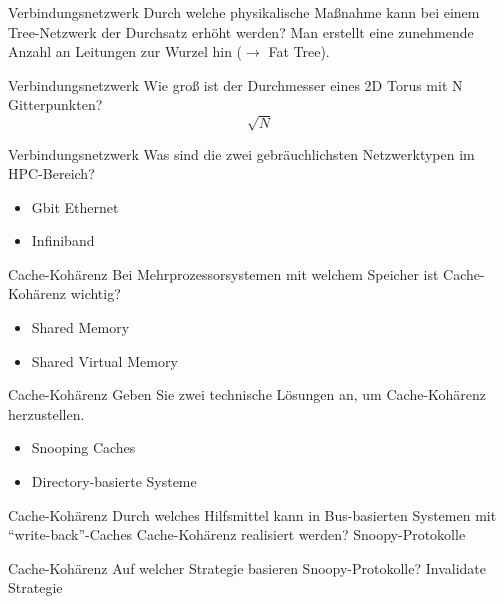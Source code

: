 \begin{aufgabe}{Verbindungsnetzwerk}
    Durch welche physikalische Maßnahme kann bei einem Tree-Netzwerk der Durchsatz erhöht werden?
    \tcblower
    Man erstellt eine zunehmende Anzahl an Leitungen zur Wurzel hin ($\to$ Fat Tree).
\end{aufgabe}

\begin{aufgabe}{Verbindungsnetzwerk}
    Wie groß ist der Durchmesser eines 2D Torus mit N Gitterpunkten?
    \tcblower
    $$\sqrt{N}$$
\end{aufgabe}

\begin{aufgabe}{Verbindungsnetzwerk}
    Was sind die zwei gebräuchlichsten Netzwerktypen im HPC-Bereich?
    \tcblower
    \begin{itemize}
        \item Gbit Ethernet
        \item Infiniband
    \end{itemize}
\end{aufgabe}

\begin{aufgabe}{Cache-Kohärenz}
    Bei Mehrprozessorsystemen mit welchem Speicher ist Cache-Kohärenz wichtig?
    \tcblower
    \begin{itemize}
        \item Shared Memory
        \item Shared Virtual Memory
    \end{itemize}
\end{aufgabe}

\begin{aufgabe}{Cache-Kohärenz}
    Geben Sie zwei technische Lösungen an, um Cache-Kohärenz herzustellen.
    \tcblower
    \begin{itemize}
        \item Snooping Caches
        \item Directory-basierte Systeme
    \end{itemize}
\end{aufgabe}

\begin{aufgabe}{Cache-Kohärenz}
    Durch welches Hilfsmittel kann in Bus-basierten Systemen mit \enquote{write-back}-Caches Cache-Kohärenz realisiert werden?
    \tcblower
    Snoopy-Protokolle
\end{aufgabe}

\begin{aufgabe}{Cache-Kohärenz}
    Auf welcher Strategie basieren Snoopy-Protokolle?
    \tcblower
    Invalidate Strategie
\end{aufgabe}

